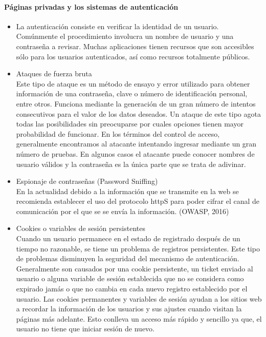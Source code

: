 \documentclass[12pt, a4paper, titlepage]{article}
\begin{document}
		\paragraph{Páginas privadas y los sistemas de autenticación}
		\begin{itemize}
		    \item La autenticación consiste en verificar la identidad de un usuario. Comúnmente el procedimiento involucra un nombre de usuario y una contraseña a revisar. Muchas aplicaciones tienen recursos que son accesibles sólo para los usuarios autenticados, así como recursos totalmente públicos.
		    
		    \item Ataques de fuerza bruta \\
		    Este tipo de ataque es un método de ensayo y error utilizado para obtener información de una contraseña, clave o número de identificación personal, entre otros. Funciona mediante la generación de un gran número de intentos consecutivos para el valor de los datos deseados. Un ataque de este tipo agota todas las posibilidades sin preocuparse por cuales opciones tienen mayor probabilidad de funcionar.
            En los términos del control de acceso, generalmente encontramos al atacante intentando ingresar mediante un gran número de pruebas. En algunos casos el atacante puede conocer nombres de usuario válidos y la contraseña es la única parte que se trata de adivinar.
            
            \item Espionaje de contraseñas (Password Sniffing)\\
            En la actualidad debido a la información que se transmite en la web se recomienda establecer el uso del protocolo \acrshort{http}S para poder cifrar el canal de comunicación por el que se se envía la información. (OWASP, 2016)
            
            \item Cookies o variables de sesión persistentes\\
            Cuando un usuario permanece en el estado de registrado después de un tiempo no razonable, se tiene un problema de registros persistentes.
            Este tipo de problemas disminuyen la seguridad del mecanismo de autenticación. \\
            Generalmente son causados por una cookie persistente, un ticket enviado al usuario o alguna variable de sesión establecida que no se considera como expirado jamás o que no cambia en cada nuevo registro establecido por el usuario.
            Las cookies permanentes y variables de sesión ayudan a los sitios web a recordar la información de los usuarios y sus ajustes cuando visitan la páginas más adelante. Esto conlleva un acceso más rápido y sencillo ya que, el usuario no tiene que iniciar sesión de nuevo.
            
		\end{itemize}
		
\end{document}
